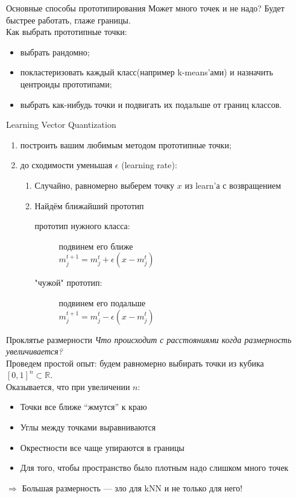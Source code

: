 \documentclass[14pt, fleqn, xcolor={dvipsnames, table}]{beamer}
\begin{document}
\begin{frame}{Основные способы прототипирования}
  Может много точек и не надо? Будет быстрее работать, глаже границы. \\
  Как выбрать прототипные точки:
  \begin{itemize}
    \item выбрать рандомно;
    \item покластеризовать каждый класс(например k-means'ами) и назначить центроиды прототипами;
    \item выбрать как-нибудь точки и подвигать их подальше от границ классов.
  \end{itemize}
\end{frame}

\begin{frame}{Learning Vector Quantization}
\begin{enumerate}
   \item построить вашим любимым методом прототипные точки;
   \item до сходимости уменьшая $\epsilon$ (learning rate): 
    \begin{enumerate}
      \item Случайно, равномерно выберем точку $x$ из learn'а с возвращением
      \item Найдём ближайший прототип
      \begin{description}
        \item [\color{blue}прототип нужного класса:] подвинем его ближе \\
        $ m_j^{t+1} = m_j^t + \epsilon (x - m_j^t)$ \\
        \item [\color{blue}"чужой" прототип:] подвинем его подальше \\
        $ m_j^{t+1} = m_j^t - \epsilon (x - m_j^t)$
      \end{description}
    \end{enumerate}
\end{enumerate}
\end{frame}

\begin{frame}{Проклятье размерности}
\emph{Что происходит с расстояниями когда размерность увеличивается?} \\
Проведем простой опыт: будем равномерно выбирать точки из кубика $[0, 1]^n \subset \mathbb{R}$. \\
Оказывается, что при увеличении $n$:
\begin{itemize}
  \item Точки все ближе “жмутся” к краю
  \item Углы между точками выравниваются
  \item Окрестности все чаще упираются в границы
  \item Для того, чтобы пространство было плотным надо слишком много точек
\end{itemize}
$\Rightarrow$ Большая размерность — зло для kNN и не только для него!
\end{frame}
\end{document}
